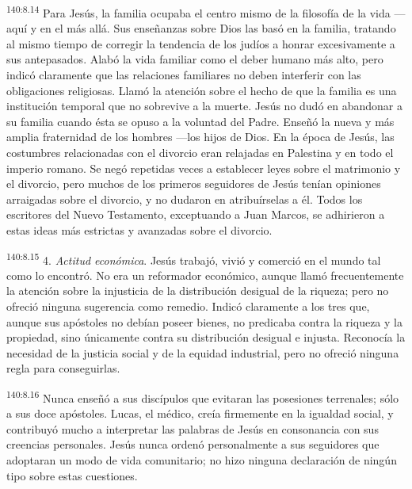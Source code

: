 \par
\textsuperscript{140:8.14} Para Jesús, la familia ocupaba el centro mismo de la filosofía de la vida ---aquí y en el más allá. Sus enseñanzas sobre Dios las basó en la familia, tratando al mismo tiempo de corregir la tendencia de los judíos a honrar excesivamente a sus antepasados. Alabó la vida familiar como el deber humano más alto, pero indicó claramente que las relaciones familiares no deben interferir con las obligaciones religiosas. Llamó la atención sobre el hecho de que la familia es una institución temporal que no sobrevive a la muerte. Jesús no dudó en abandonar a su familia cuando ésta se opuso a la voluntad del Padre. Enseñó la nueva y más amplia fraternidad de los hombres ---los hijos de Dios. En la época de Jesús, las costumbres relacionadas con el divorcio eran relajadas en Palestina y en todo el imperio romano. Se negó repetidas veces a establecer leyes sobre el matrimonio y el divorcio, pero muchos de los primeros seguidores de Jesús tenían opiniones arraigadas sobre el divorcio, y no dudaron en atribuírselas a él. Todos los escritores del Nuevo Testamento, exceptuando a Juan Marcos, se adhirieron a estas ideas más estrictas y avanzadas sobre el divorcio.

\par
\textsuperscript{140:8.15} 4. \textit{Actitud económica}. Jesús trabajó, vivió y comerció en el mundo tal como lo encontró. No era un reformador económico, aunque llamó frecuentemente la atención sobre la injusticia de la distribución desigual de la riqueza; pero no ofreció ninguna sugerencia como remedio. Indicó claramente a los tres que, aunque sus apóstoles no debían poseer bienes, no predicaba contra la riqueza y la propiedad, sino únicamente contra su distribución desigual e injusta. Reconocía la necesidad de la justicia social y de la equidad industrial, pero no ofreció ninguna regla para conseguirlas.

\par
\textsuperscript{140:8.16} Nunca enseñó a sus discípulos que evitaran las posesiones terrenales; sólo a sus doce apóstoles. Lucas, el médico, creía firmemente en la igualdad social, y contribuyó mucho a interpretar las palabras de Jesús en consonancia con sus creencias personales. Jesús nunca ordenó personalmente a sus seguidores que adoptaran un modo de vida comunitario; no hizo ninguna declaración de ningún tipo sobre estas cuestiones.

